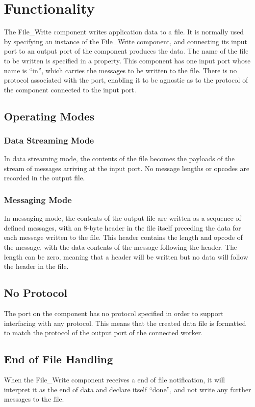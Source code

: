 \documentclass{article}
\begin{document}
\section*{Functionality}
\begin{flushleft}
The File\_Write component writes application data to a file. It is normally used by
specifying an instance of the File\_Write component, and connecting its input port to an
output port of the component produces the data. The name of the file to be written is
specified in a property.
This component has one input port whose name is ``in'', which carries the messages to
be written to the file. There is no protocol associated with the port, enabling it to be
agnostic as to the protocol of the component connected to the input port.
\subsection*{Operating Modes}
\subsubsection*{Data Streaming Mode}
In data streaming mode, the contents of the file becomes the payloads of the stream of
messages arriving at the input port. No message lengths or opcodes are recorded in
the output file.
\newpage
\subsubsection*{Messaging Mode}
In messaging mode, the contents of the output file are written as a sequence of defined
messages, with an 8-byte header in the file itself preceding the data for each message
written to the file. This header contains the length and opcode of the message, with the
data contents of the message following the header. The length can be zero, meaning
that a header will be written but no data will follow the header in the file.\\
\medskip \medskip

\subsection*{No Protocol}
The port on the component has no protocol specified in order to support interfacing with any protocol.  This means that the created data file is formatted to match the protocol of the output port of the connected worker.
\subsection*{End of File Handling}
When the File\_Write component receives a end of file notification, it will interpret it as
the end of data and declare itself ``done'', and not write any further messages to the file. 
\end{flushleft}
\end{document}
